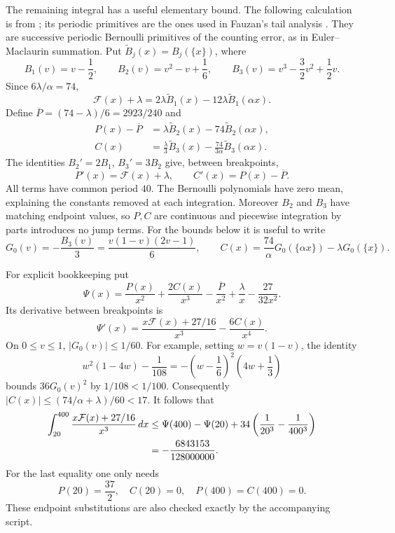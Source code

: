 The remaining integral has a useful elementary bound. The following
calculation is from
\cite[\texttt{Growth/TailIntegral.lean}]{firsching}; its periodic
primitives are the ones used in Fauzan's tail analysis
\cite[Section 5.3]{fauzan}.
They are successive periodic Bernoulli primitives of the counting
error, as in Euler--Maclaurin summation. Put
\(\widetilde B_j(x)=B_j(\{x\})\), where
\[
 B_1(v)=v-\frac12,\qquad
 B_2(v)=v^2-v+\frac16,\qquad
 B_3(v)=v^3-\frac32v^2+\frac12v.
\]
Since \(6\lambda/\alpha=74\),
\[
 \mathcal F(x)+\lambda
 =2\lambda\widetilde B_1(x)
       -12\lambda\widetilde B_1(\alpha x).
\]
Define \(\overline P=(74-\lambda)/6=2923/240\) and
\begin{align*}
 P(x)-\overline P
   &=\lambda\widetilde B_2(x)-74\widetilde B_2(\alpha x),\\
 C(x)&=\frac{\lambda}{3}\widetilde B_3(x)
           -\frac{74}{3\alpha}\widetilde B_3(\alpha x).
\end{align*}
The identities \(B_2'=2B_1\), \(B_3'=3B_2\)
\cite[24.4]{dlmf} give, between breakpoints,
\[
 P'(x)=\mathcal F(x)+\lambda,\qquad
 C'(x)=P(x)-\overline P.
\]
All terms have common period \(40\). The Bernoulli polynomials have
zero mean, explaining the constants removed at each integration.
Moreover \(B_2\) and \(B_3\) have matching endpoint values, so \(P,C\)
are continuous and piecewise integration by parts introduces no jump
terms. For the bounds below it is useful to write
\[
 G_0(v)=-\frac{B_3(v)}3=\frac{v(1-v)(2v-1)}6,\qquad
 C(x)=\frac{74}{\alpha}G_0(\{\alpha x\})-\lambda G_0(\{x\}).
\]

For explicit bookkeeping put
\[
 \Psi(x)=\frac{P(x)}{x^2}+\frac{2C(x)}{x^3}
       -\frac{\overline P}{x^2}+\frac{\lambda}{x}
       -\frac{27}{32x^2}.
\]
Its derivative between breakpoints is
\[
 \Psi'(x)=\frac{x\mathcal F(x)+27/16}{x^3}
                -\frac{6C(x)}{x^4}.
\]
On \(0\le v\le1\), \(|G_0(v)|\le1/60\). For example, setting
\(w=v(1-v)\), the identity
\[
 w^2(1-4w)-\frac1{108}
 =-\left(w-\frac16\right)^2\left(4w+\frac13\right)
\]
bounds \(36G_0(v)^2\) by \(1/108<1/100\).
Consequently \(|C(x)|\le(74/\alpha+\lambda)/60<17\).
It follows that
\begin{align}
 \int_{20}^{400}\frac{x\mathcal F(x)+27/16}{x^3}\,dx
 &\le\Psi(400)-\Psi(20)
             +34\left(\frac1{20^3}-\frac1{400^3}\right)\notag\\
 &=-\frac{6843153}{128000000}.
 \label{growth:tail-integral}
\end{align}
For the last equality one only needs
\[
 P(20)=\frac{37}{2},\quad C(20)=0,\quad
 P(400)=C(400)=0.
\]
These endpoint substitutions are also checked exactly by the
accompanying script.

